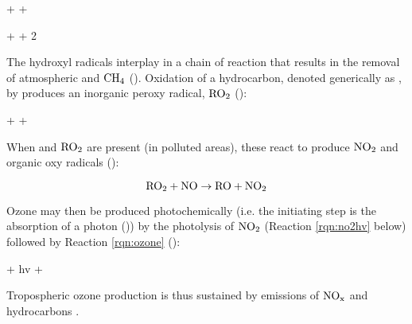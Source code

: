 \begin{reaction}
     +  \rightarrow {} + 
    \label{rqn:oh_o3}
\end{reaction}
\begin{reaction}
     +  \rightarrow {} + 2
    \label{rqn:ho2_o3}
\end{reaction}

The hydroxyl radicals interplay in a chain of reaction that results in the removal of atmospheric  and $\mathrm{CH_4}$ (\cite{Levy1971}). Oxidation of a hydrocarbon, denoted generically as , by  produces an inorganic peroxy radical, $\mathrm{RO_2}$ (\cite{Jacob1999}):

\begin{reaction}
     +    + 
\end{reaction}

When  and $\mathrm{RO_2}$ are present (in polluted areas), these react to produce $\mathrm{NO_2}$ and organic oxy radicals  (\cite{Jacob1999}): 

\begin{equation}
    \mathrm{RO_2} + \mathrm{NO} \rightarrow \mathrm{RO} + \mathrm{NO_2}
\end{equation}

Ozone may then be produced photochemically (i.e. the initiating step is the absorption of a photon (\cite{Cadle1970})) by the photolysis of $\mathrm{NO_2}$ (Reaction \ref{rqn:no2hv} below) followed by Reaction \ref{rqn:ozone} (\cite{Hesstvedt1978}): 


\begin{reaction}
     + hv \rightarrow {} + 
    \label{rqn:no2hv}
\end{reaction}

Tropospheric ozone production is thus sustained by emissions of $\mathrm{NO_x}$ and hydrocarbons \cite{Jacob1999}. 







%

